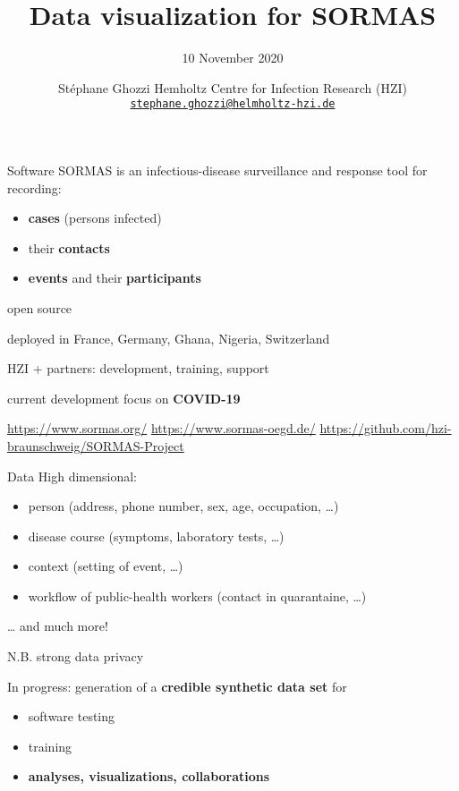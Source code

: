 \documentclass[
  8pt,
  ignorenonframetext,
]{beamer}
\title{Data visualization for SORMAS}
\subtitle{10 November 2020}
\author{\newline \newline Stéphane Ghozzi \newline \small Hemholtz
Centre for Infection Research (HZI)
\newline \href{mailto:stephane.ghozzi@helmholtz-hzi.de}{\nolinkurl{stephane.ghozzi@helmholtz-hzi.de}}
\normalsize}
\date{}
\providecommand{\tightlist}{%
  \setlength{\itemsep}{0pt}\setlength{\parskip}{0pt}}
\begin{document}
\frame{\titlepage}

\begin{frame}{Software}
\protect\hypertarget{software}{}
SORMAS is an infectious-disease surveillance and response tool for
recording:

\begin{itemize}
\tightlist
\item
  \textbf{cases} (persons infected)
\item
  their \textbf{contacts}
\item
  \textbf{events} and their \textbf{participants}
\end{itemize}

\vspace{0.75cm}

open source

deployed in France, Germany, Ghana, Nigeria, Switzerland

HZI + partners: development, training, support

current development focus on \textbf{COVID-19}

\vspace{0.75cm}

\url{https://www.sormas.org/} \newline \url{https://www.sormas-oegd.de/}
\newline \url{https://github.com/hzi-braunschweig/SORMAS-Project}
\end{frame}

\begin{frame}{Data}
\protect\hypertarget{data}{}
High dimensional:

\begin{itemize}
\tightlist
\item
  person (address, phone number, sex, age, occupation, \ldots)
\item
  disease course (symptoms, laboratory tests, \ldots)
\item
  context (setting of event, \ldots)
\item
  workflow of public-health workers (contact in quarantaine, \ldots)
\end{itemize}

\ldots{} and much more!

N.B. strong data privacy

\vspace{0.75cm}

In progress: generation of a \textbf{credible synthetic data set} for

\begin{itemize}
\tightlist
\item
  software testing
\item
  training
\item
  \textbf{analyses, visualizations, collaborations}
\end{itemize}
\end{frame}
\end{document}
